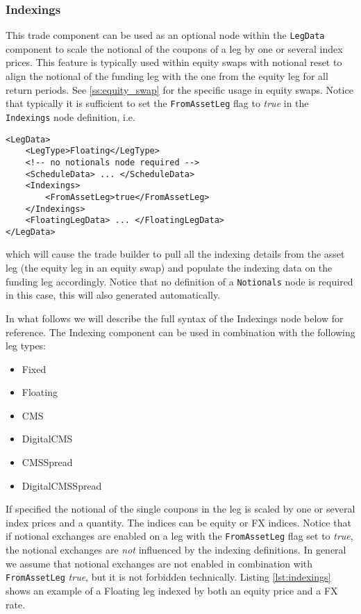 \subsubsection{Indexings}
\label{ss:indexings}

This trade component can be used as an optional node within the \lstinline!LegData! component to scale the notional of the coupons
of a leg by one or several index prices. This feature is typically used within equity swaps with notional reset to align
the notional of the funding leg with the one from the equity leg for all return periods. See \ref{ss:equity_swap} for
the specific usage in equity swaps. Notice that typically it is sufficient to set the \lstinline!FromAssetLeg! flag to \emph{true} in the
\verb+Indexings+ node definition, i.e.

\begin{verbatim}
<LegData>
    <LegType>Floating</LegType>
    <!-- no notionals node required -->
    <ScheduleData> ... </ScheduleData>
    <Indexings>
        <FromAssetLeg>true</FromAssetLeg>
    </Indexings>
    <FloatingLegData> ... </FloatingLegData>
</LegData>
\end{verbatim}

which will cause the trade builder to pull all the indexing details from the asset leg (the equity leg in an equity
swap) and populate the indexing data on the funding leg accordingly. Notice that no definition of a \verb+Notionals+
node is required in this case, this will also generated automatically.

In what follows we will describe the full syntax of the Indexings node below for reference. The Indexing component can
be used in combination with the following leg types:

\begin{itemize}
\item Fixed
\item Floating
\item CMS
\item DigitalCMS
\item CMSSpread
\item DigitalCMSSpread
\end{itemize}

If specified the notional of the single coupons in the leg is scaled by one or several index prices and a quantity. The
indices can be equity or FX indices. Notice that if notional exchanges are enabled on a leg with the \lstinline!FromAssetLeg! flag set to \emph{true}, the
notional exchanges are {\em not} influenced by the indexing definitions. In general we assume that notional exchanges
are not enabled in combination with \lstinline!FromAssetLeg! \emph{true}, but it is not forbidden technically.  Listing \ref{lst:indexings} shows an
example of a Floating leg indexed by both an equity price and a FX rate.

